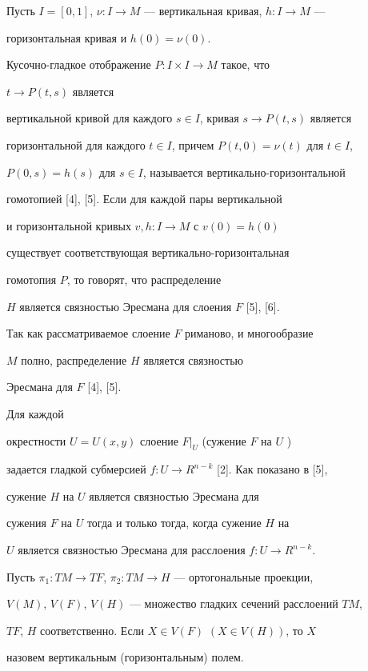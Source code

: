 Пусть $I = [0,1]$, $\nu :I\to M$ --- вертикальная кривая, $h:I\to M$ ---


горизонтальная кривая и $h(0)=\nu(0)$. 


Кусочно-гладкое отображение $P:I\times I\to M$ такое, что 


$t\to P(t,s)$ является 


вертикальной кривой для каждого $s\in I$, кривая $s\to P(t,s)$ является 


горизонтальной для каждого $t\in I$, причем $P(t,0)=\nu (t)$ для $t\in I$, 


$P(0,s)=h(s)$ для $s\in I$, называется вертикально-горизонтальной


гомотопией [4], [5]. Если для каждой пары вертикальной


и горизонтальной кривых $v, h:I\to M$ с $v(0)=h(0)$


существует соответствующая вертикально-горизонтальная 


гомотопия $P$, то говорят, что распределение 


$H$ является связностью Эресмана для слоения $F$ [5], [6]. 


Так как рассматриваемое слоение $F$ риманово, и многообразие 


$M$ полно, распределение $H$ является связностью 


Эресмана для $F$ [4], [5].


Для каждой 


окрестности $U=U(x,y)$ слоение $F|_U$ (сужение $F$ на $U$ ) 


задается гладкой субмерсией $f:U\to R^{n-k}$ [2]. Как показано в [5], 


сужение $H$ на $U$ является связностью Эресмана для 


сужения $F$ на $U$ тогда и только тогда, когда сужение $H$ на 


$U$ является связностью Эресмана для расслоения $f:U\to R^{n-k}$.





Пусть $\pi_1:TM\to TF$, $\pi_2:TM\to H$ --- ортогональные проекции,


$V(M)$, $V(F)$, $V(H)$ --- множество гладких сечений расслоений $TM$, 


$TF$, $H$ соответственно. Если $X\in V(F)$ $(X\in V(H))$, то $X$ 


назовем вертикальным (горизонтальным) полем.





